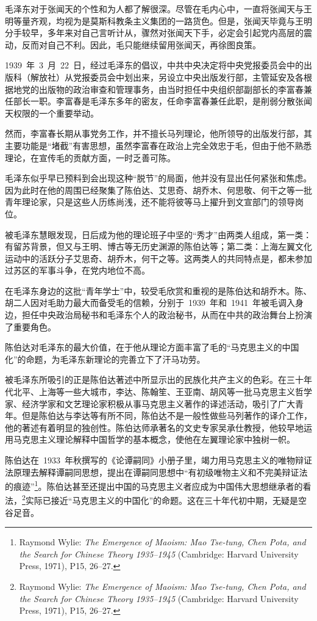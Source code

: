 毛泽东对于张闻天的个性和为人都了解很深。尽管在毛内心中，一直将张闻天与王明等量齐观，均视为是莫斯科教条主义集团的一路货色。但是，张闻天毕竟与王明分手较早，多年来对自己言听计从，骤然对张闻天下手，必定会引起党内高层的震动，反而对自己不利。因此，毛只能继续留用张闻天，再徐图良策。

1939~年~3~月~22~日，经过毛泽东的倡议，中共中央决定将中央党报委员会中的出版科（解放社）从党报委员会中划出来，另设立中央出版发行部，主管延安及各根据地党的出版物的政治审查和管理事务，由当时担任中央组织部副部长的李富春兼任部长一职。李富春是毛泽东多年的密友，任命李富春兼任此职，是削弱分散张闻天权限的一个重要举动。

然而，李富春长期从事党务工作，并不擅长马列理论，他所领导的出版发行部，其主要功能是“堵截”有害思想，虽然李富春在政治上完全效忠于毛，但由于他不熟悉理论，在宣传毛的贡献方面，一时乏善可陈。

毛泽东似乎早已预料到会出现这种“脱节”的局面，他并没有显出任何紧张和焦虑。因为此时在他的周围已经聚集了陈伯达、艾思奇、胡乔木、何思敬、何干之等一批青年理论家，只是这些人历练尚浅，还不能将彼等马上擢升到文宣部门的领导岗位。

被毛泽东慧眼发现，日后成为他的理论班子中坚的“秀才”由两类人组成，第一类：有留苏背景，但又与王明、博古等无历史渊源的陈伯达等；第二类：上海左翼文化运动中的活跃分子艾思奇、胡乔木，何干之等。这两类人的共同特点是，都未参加过苏区的军事斗争，在党内地位不高。

在毛泽东身边的这批“青年学士”中，较受毛欣赏和重视的是陈伯达和胡乔木。陈、胡二人因对毛助力最大而备受毛的信赖，分别于~1939~年和~1941~年被毛调入身边，担任中央政治局秘书和毛泽东个人的政治秘书，从而在中共的政治舞台上扮演了重要角色。

陈伯达对毛泽东的最大价值，在于他从理论方面丰富了毛的“马克思主义的中国化”的命题，为毛泽东新理论的完善立下了汗马功劳。

被毛泽东所吸引的正是陈伯达著述中所显示出的民族化共产主义的色彩。在三十年代北平、上海等一些大城市，李达、陈翰笙、王亚南、胡风等一批马克思主义哲学家、经济学家和文艺理论家积极从事马克思主义著作的译述活动，吸引了广大青年。但是陈伯达与李达等有所不同，陈伯达不是一般性做些马列著作的译介工作，他的著述有着明显的独创性。陈伯达师承著名的文史专家吴承仕教授，他较早地运用马克思主义理论解释中国哲学的基本概念，使他在左翼理论家中独树一帜。

陈伯达在~1933~年秋撰写的《论谭嗣同》小册子里，竭力用马克思主义的唯物辩证法原理去解释谭嗣同思想，提出在谭嗣同思想中“有初级唯物主义和不完美辩证法的痕迹”\footnote{Raymond Wylie: \textit{The Emergence of Maoism: Mao Tse-tung, Chen Pota, and the Search for Chinese Theory 1935--1945} (Cambridge: Harvard University Press, 1971), P15, 26--27.}。陈伯达甚至还提出中国的马克思主义者应成为中国伟大思想继承者的看法，\footnote{Raymond Wylie: \textit{The Emergence of Maoism: Mao Tse-tung, Chen Pota, and the Search for Chinese Theory 1935--1945} (Cambridge: Harvard University Press, 1971), P15, 26--27.}实际已接近“马克思主义的中国化”的命题。这在三十年代初中期，无疑是空谷足音。

